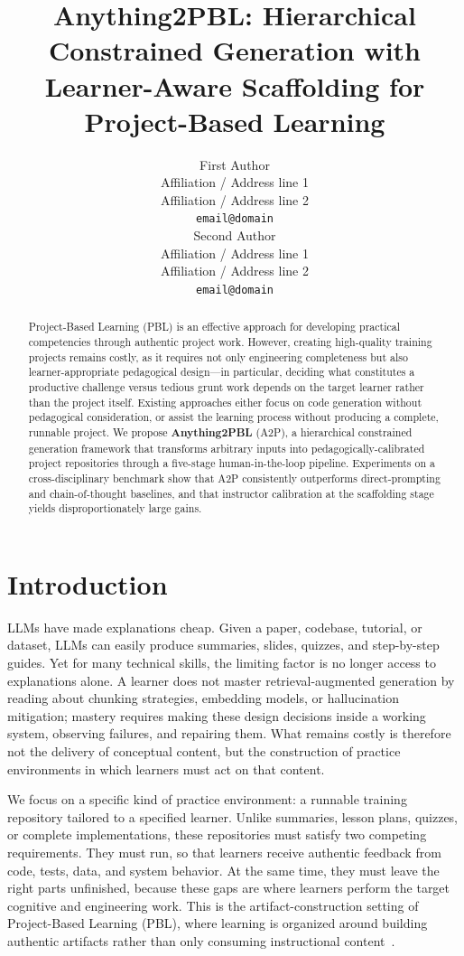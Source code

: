 \documentclass[11pt]{article}
\title{Anything2PBL: Hierarchical Constrained Generation with \\ Learner-Aware Scaffolding for Project-Based Learning}
\author{First Author \\
  Affiliation / Address line 1 \\
  Affiliation / Address line 2 \\
  \texttt{email@domain} \\\And
  Second Author \\
  Affiliation / Address line 1 \\
  Affiliation / Address line 2 \\
  \texttt{email@domain} \\}
\begin{document}
\maketitle

\begin{abstract}
Project-Based Learning (PBL) is an effective approach for developing practical competencies through authentic project work.
However, creating high-quality training projects remains costly, as it requires not only engineering completeness but also learner-appropriate pedagogical design---in particular, deciding what constitutes a productive challenge versus tedious grunt work depends on the target learner rather than the project itself.
Existing approaches either focus on code generation without pedagogical consideration, or assist the learning process without producing a complete, runnable project.
We propose \textbf{Anything2PBL} (A2P), a hierarchical constrained generation framework that transforms arbitrary inputs into pedagogically-calibrated project repositories through a five-stage human-in-the-loop pipeline.
Experiments on a cross-disciplinary benchmark show that A2P consistently outperforms direct-prompting and chain-of-thought baselines, and that instructor calibration at the scaffolding stage yields disproportionately large gains.
\end{abstract}

\section{Introduction}

LLMs have made explanations cheap.
Given a paper, codebase, tutorial, or dataset, LLMs can easily produce summaries, slides, quizzes, and step-by-step guides.
Yet for many technical skills, the limiting factor is no longer access to explanations alone.
A learner does not master retrieval-augmented generation by reading about chunking strategies, embedding models, or hallucination mitigation; mastery requires making these design decisions inside a working system, observing failures, and repairing them.
What remains costly is therefore not the delivery of conceptual content, but the construction of practice environments in which learners must act on that content.

\noindent
We focus on a specific kind of practice environment: a runnable training repository tailored to a specified learner.
Unlike summaries, lesson plans, quizzes, or complete implementations, these repositories must satisfy two competing requirements.
They must run, so that learners receive authentic feedback from code, tests, data, and system behavior.
At the same time, they must leave the right parts unfinished, because these gaps are where learners perform the target cognitive and engineering work.
This is the artifact-construction setting of Project-Based Learning (PBL), where learning is organized around building authentic artifacts rather than only consuming instructional content~\cite{kilpatrick1918,thomas2000}.
\end{document}

